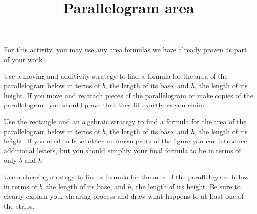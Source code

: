 \documentclass[nooutcomes,noauthor]{ximera}
\title{Parallelogram area}
\begin{document}
\begin{abstract}
\end{abstract}

\maketitle

For this activity, you may use any area formulas we have already proven as part of your work.

\begin{problem}
Use a moving and additivity strategy to find a formula for the area of the parallelogram below in terms of $b$, the length of its base, and $h$, the length of its height. If you move and reattach pieces of the parallelogram or make copies of the parallelogram, you should prove that they fit exactly as you claim.

\begin{image}
\end{image}
\end{problem} \vfill

\begin{problem}
Use the rectangle and an algebraic strategy to find a formula for the area of the parallelogram below in terms of $b$, the length of its base, and $h$, the length of its height. If you need to label other unknown parts of the figure you can introduce additional letters, but you should simplify your final formula to be in terms of only $b$ and $h$.

\begin{image}
\end{image}
\end{problem} \vfill

\newpage
\begin{problem}
Use a shearing strategy to find a formula for the area of the parallelogram below in terms of $b$, the length of its base, and $h$, the length of its height. Be sure to clearly explain your shearing process and draw what happens to at least one of the strips.

\begin{image}
\end{image}
\end{problem}
\end{document}
